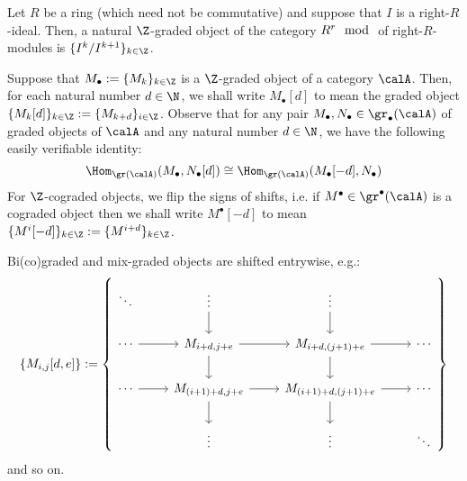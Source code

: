             \begin{example}
                Let $R$ be a ring (which need not be commutative) and suppose that $I$ is a right-$R$-ideal. Then, a natural $\Z$-graded object of the category $R^r\mod$ of right-$R$-modules is $\{I^k/I^{k + 1}\}_{k \in \Z}$.
            \end{example}
            \begin{convention}[Shifts] \label{conv: shifts_of_graded_objects}
                Suppose that $M_{\bullet} := \{M_k\}_{k \in \Z}$ is a $\Z$-graded object of a category $\calA$. Then, for each natural number $d \in \N$, we shall write $M_{\bullet}[d]$ to mean the graded object $\{M_k[d]\}_{k \in \Z} := \{M_{k + d}\}_{i \in \Z}$. Observe that for any pair $M_{\bullet}, N_{\bullet} \in \gr_{\bullet}(\calA)$ of graded objects of $\calA$ and any natural number $d \in \N$, we have the following easily verifiable identity:
                    $$\Hom_{\gr(\calA)}(M_{\bullet}, N_{\bullet}[d]) \cong \Hom_{\gr(\calA)}(M_{\bullet}[-d], N_{\bullet})$$
                For $\Z$-cograded objects, we flip the signs of shifts, i.e. if $M^{\bullet} \in \gr^{\bullet}(\calA)$ is a cograded object then we shall write $M^{\bullet}[-d]$ to mean $\{M^i[-d]\}_{k \in \Z} := \{M^{i + d}\}_{k \in \Z}$.
                
                Bi(co)graded and mix-graded objects are shifted entrywise, e.g.:
                    $$
                        \{M_{i, j}[d, e]\} := 
                        \left\{
                            \begin{tikzcd}
                        	\ddots & \vdots & \vdots \\
                        	\cdots & {M_{i + d, j + e}} & {M_{i + d, (j + 1) + e}} & \cdots \\
                        	\cdots & {M_{(i + 1) + d, j + e}} & {M_{(i + 1) + d, (j + 1) + e}} & \cdots \\
                        	& \vdots & \vdots & \ddots
                        	\arrow[from=2-2, to=3-2]
                        	\arrow[from=3-2, to=4-2]
                        	\arrow[from=3-3, to=4-3]
                        	\arrow[from=2-3, to=3-3]
                        	\arrow[from=2-2, to=2-3]
                        	\arrow[from=3-2, to=3-3]
                        	\arrow[from=3-3, to=3-4]
                        	\arrow[from=2-3, to=2-4]
                        	\arrow[from=2-1, to=2-2]
                        	\arrow[from=1-2, to=2-2]
                        	\arrow[from=1-3, to=2-3]
                        	\arrow[from=3-1, to=3-2]
                        \end{tikzcd}
                        \right\}
                    $$
                and so on.
            \end{convention}
            
